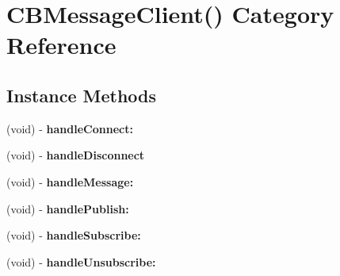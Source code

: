 \hypertarget{category_c_b_message_client_07_08}{\section{C\-B\-Message\-Client() Category Reference}
\label{category_c_b_message_client_07_08}
}
\subsection*{Instance Methods}
\begin{DoxyCompactItemize}
\item 
\hypertarget{category_c_b_message_client_07_08_a8796e44a34e000a06b70041e686bc3bf}{(void) -\/ {\bfseries handle\-Connect\-:}}\label{category_c_b_message_client_07_08_a8796e44a34e000a06b70041e686bc3bf}

\item 
\hypertarget{category_c_b_message_client_07_08_addb1b9213a29dd815c97f705c0865517}{(void) -\/ {\bfseries handle\-Disconnect}}\label{category_c_b_message_client_07_08_addb1b9213a29dd815c97f705c0865517}

\item 
\hypertarget{category_c_b_message_client_07_08_a03b88809c4e42eca1fc342322d44ea3a}{(void) -\/ {\bfseries handle\-Message\-:}}\label{category_c_b_message_client_07_08_a03b88809c4e42eca1fc342322d44ea3a}

\item 
\hypertarget{category_c_b_message_client_07_08_a34d0cebe870a44cfc350b434ae1ad066}{(void) -\/ {\bfseries handle\-Publish\-:}}\label{category_c_b_message_client_07_08_a34d0cebe870a44cfc350b434ae1ad066}

\item 
\hypertarget{category_c_b_message_client_07_08_acf8440144373221fb951c279aa3e6038}{(void) -\/ {\bfseries handle\-Subscribe\-:}}\label{category_c_b_message_client_07_08_acf8440144373221fb951c279aa3e6038}

\item 
\hypertarget{category_c_b_message_client_07_08_a6adf38012722dcfb31bf46dd272e6c1c}{(void) -\/ {\bfseries handle\-Unsubscribe\-:}}\label{category_c_b_message_client_07_08_a6adf38012722dcfb31bf46dd272e6c1c}

\end{DoxyCompactItemize}
